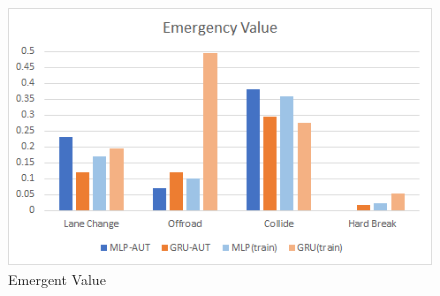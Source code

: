 \begin{figure}[H]
\begin{center}
\includegraphics[width=14cm]{./figures/graph_emergency.png}
\caption{Emergent Value}
\label{fig:graph_emergency}
\end{center}
\end{figure}



